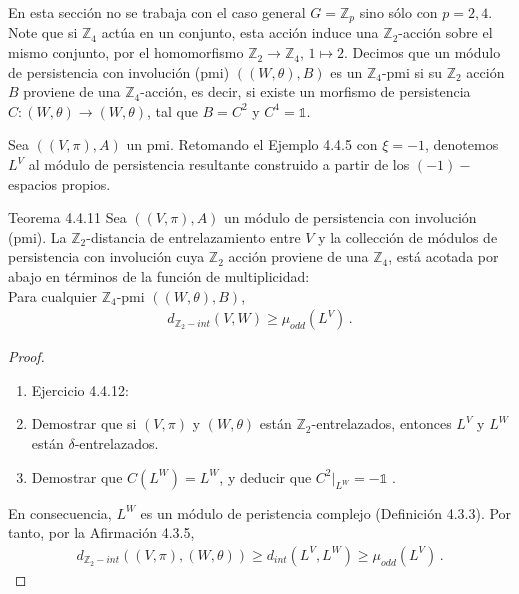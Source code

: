 \documentclass{beamer}
\newcounter{Ejercicio}
\begin{document}
\begin{frame}
En esta secci\'on no se trabaja con el caso general $G=\mathbb{Z}_{p}$ sino s\'olo con $p=2,4$. Note que si $\mathbb{Z}_4$ act\'ua en un conjunto, esta acci\'on induce una $\mathbb{Z}_2$-acci\'on sobre el mismo conjunto, por el homomorfismo $\mathbb{Z}_2\rightarrow\mathbb{Z}_4$, $1\mapsto 2$. Decimos que un módulo de persistencia con involución (pmi) $((W,\theta),B)$ es un $\mathbb{Z}_4$-pmi si su $\mathbb{Z}_2$ acci\'on $B$ proviene de una $\mathbb{Z}_4$-acci\'on, es decir, si existe un morfismo de persistencia $C:(W,\theta)\rightarrow (W,\theta)$, tal que $B=C^2$ y $C^4=\mathbb{1}$.
\vspace{2em}

Sea $((V,\pi),A)$ un pmi. Retomando el Ejemplo 4.4.5 con $\xi=-1$, denotemos $L^V$ al m\'odulo de persistencia resultante construido a partir de los $(-1)-$espacios propios.
\end{frame}


\begin{frame}{Teorema 4.4.11}
Sea $((V,\pi),A)$ un módulo de persistencia con involución (pmi). La $\mathbb{Z}_2$-distancia de entrelazamiento entre $V$ y la collecci\'on de m\'odulos de persistencia con involuci\'on cuya $\mathbb{Z}_2$ acci\'on proviene de una $\mathbb{Z}_4$, est\'a acotada por abajo en t\'erminos de la funci\'on de multiplicidad:\\
Para cualquier $\mathbb{Z}_4$-pmi $((W,\theta),B)$,
\begin{gather*}
d_{\mathbb{Z}_2-int}\left(V,W\right)\geq \mu_{odd}\left(L^V \right)\,.
\end{gather*}
\begin{proof}
\begin{enumerate}
\item[] Ejercicio 4.4.12:
\item Demostrar que si $(V,\pi)$ y $(W,\theta)$ est\'an $\mathbb{Z}_2$-entrelazados, entonces $L^V$ y $L^W$ est\'an $\delta$-entrelazados.
\item Demostrar que $C(L^W)=L^W$, y deducir que $C^2\vert_{L^W}=-\mathbb{1}$ .
\end{enumerate}
En consecuencia, $L^W$ es un m\'odulo de peristencia complejo (Definici\'on 4.3.3). Por tanto, por la Afirmaci\'on 4.3.5,
\vspace{-0.7em}
\begin{gather*}
d_{\mathbb{Z}_2-int}\left((V,\pi),(W,\theta)\right)\geq d_{int}(L^V,L^W)\geq \mu_{odd}\left(L^V \right)\,.
\end{gather*}
\end{proof}
\end{frame}
\end{document}
